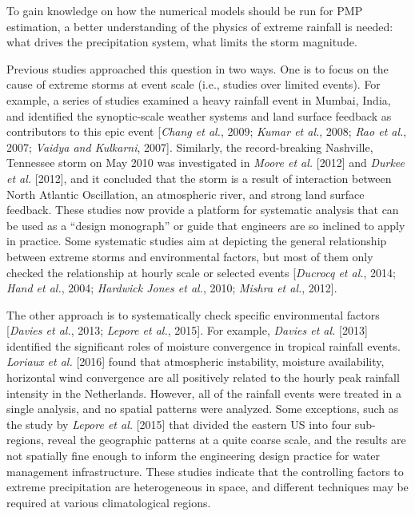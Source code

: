 To gain knowledge on how the numerical models should be run for PMP estimation, a better understanding of the physics of extreme rainfall is needed: what drives the precipitation system, what limits the storm magnitude.

Previous studies approached this question in two ways. One is to focus on the cause of extreme storms at event scale (i.e., studies over limited events). For example, a series of studies examined a heavy rainfall event in Mumbai, India, and identified the synoptic-scale weather systems and land surface feedback as contributors to this epic event [\textit{Chang et al.}, 2009; \textit{Kumar et al.}, 2008; \textit{Rao et al.}, 2007; \textit{Vaidya and Kulkarni}, 2007]. Similarly, the record-breaking Nashville, Tennessee storm on May 2010 was investigated in \textit{Moore et al.} [2012] and \textit{Durkee et al.} [2012], and it concluded that the storm is a result of interaction between North Atlantic Oscillation, an atmospheric river, and strong land surface feedback. These studies now provide a platform for systematic analysis that can be used as a ``design monograph'' or guide that engineers are so inclined to apply in practice. Some systematic studies aim at depicting the general relationship between extreme storms and environmental factors, but most of them only checked the relationship at hourly scale or selected events [\textit{Ducrocq et al.}, 2014; \textit{Hand et al.}, 2004; \textit{Hardwick Jones et al.}, 2010; \textit{Mishra et al.}, 2012].

The other approach is to systematically check specific environmental factors [\textit{Davies et al.}, 2013; \textit{Lepore et al.}, 2015]. For example, \textit{Davies et al.} [2013] identified the significant roles of moisture convergence in tropical rainfall events. \textit{Loriaux et al.} [2016] found that atmospheric instability, moisture availability, horizontal wind convergence are all positively related to the hourly peak rainfall intensity in the Netherlands. However, all of the rainfall events were treated in a single analysis, and no spatial patterns were analyzed. Some exceptions, such as the study by \textit{Lepore et al.} [2015] that divided the eastern US into four sub-regions, reveal the geographic patterns at a quite coarse scale, and the results are not spatially fine enough to inform the engineering design practice for water management infrastructure. These studies indicate that the controlling factors to extreme precipitation are heterogeneous in space, and different techniques may be required at various climatological regions.

